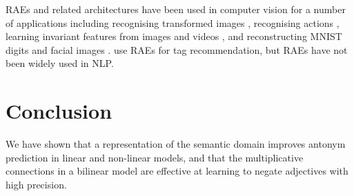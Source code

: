 \documentclass[11pt]{article}
\begin{document}
RAEs and related architectures have been used in computer vision for a number of applications including recognising transformed images \citep{memisevic:07}, 
recognising actions \citep{taylor:10}, 
learning invariant features from images and videos \citep{grimes:05,zou:12},
and reconstructing MNIST digits and facial images \citep{rudy:15}.
\citet{wang:15} use RAEs for tag recommendation, but RAEs have not been widely used in NLP.





\section{Conclusion}

We have shown that a representation of the semantic domain improves antonym prediction in linear and non-linear models, and that the multiplicative connections in a bilinear model are effective at learning to negate adjectives with high precision. 
\end{document}

